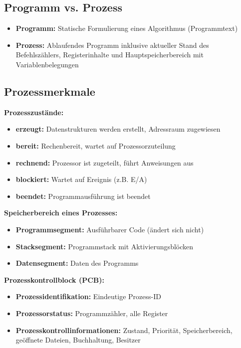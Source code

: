 \documentclass[9pt,a4paper]{extarticle}
\begin{document}
\begin{multicols*}{2}
\subsection{Programm vs. Prozess}
\begin{itemize}
\item \textbf{Programm:} Statische Formulierung eines Algorithmus (Programmtext)
\item \textbf{Prozess:} Ablaufendes Programm inklusive aktueller Stand des Befehlszählers, Registerinhalte und Hauptspeicherbereich mit Variablenbelegungen
\end{itemize}

\subsection{Prozessmerkmale}
\textbf{Prozesszustände:}
\begin{itemize}
\item \textbf{erzeugt:} Datenstrukturen werden erstellt, Adressraum zugewiesen
\item \textbf{bereit:} Rechenbereit, wartet auf Prozessorzuteilung
\item \textbf{rechnend:} Prozessor ist zugeteilt, führt Anweisungen aus
\item \textbf{blockiert:} Wartet auf Ereignis (z.B. E/A)
\item \textbf{beendet:} Programmausführung ist beendet
\end{itemize}

\textbf{Speicherbereich eines Prozesses:}
\begin{itemize}
\item \textbf{Programmsegment:} Ausführbarer Code (ändert sich nicht)
\item \textbf{Stacksegment:} Programmstack mit Aktivierungsblöcken
\item \textbf{Datensegment:} Daten des Programms
\end{itemize}

\textbf{Prozesskontrollblock (PCB):}
\begin{itemize}
\item \textbf{Prozessidentifikation:} Eindeutige Prozess-ID
\item \textbf{Prozessorstatus:} Programmzähler, alle Register
\item \textbf{Prozesskontrollinformationen:} Zustand, Priorität, Speicherbereich, geöffnete Dateien, Buchhaltung, Besitzer
\end{itemize}


\end{multicols*}
\end{document}
